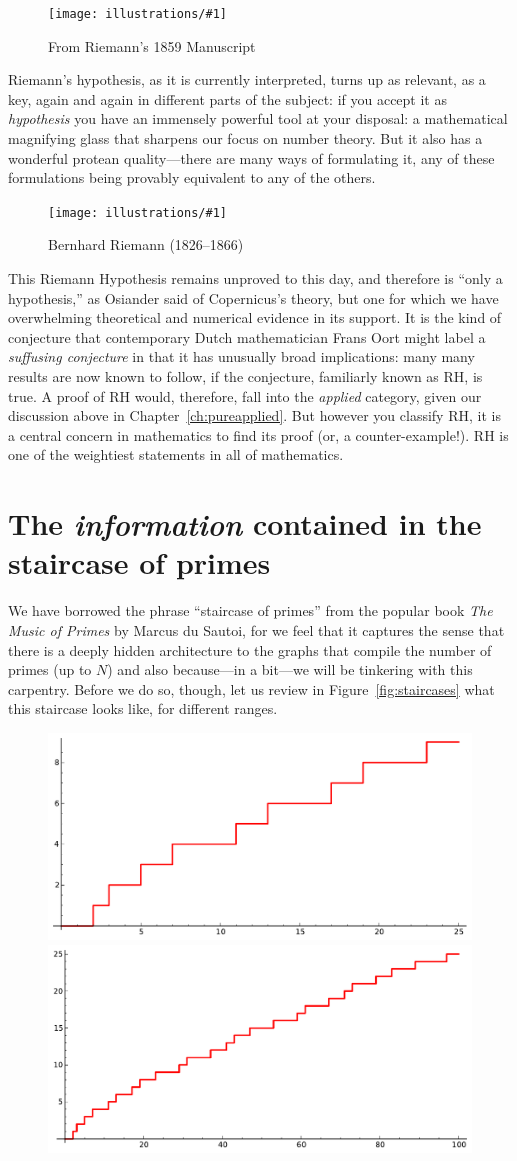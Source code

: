 \documentclass[openany]{book}
\newcommand{\ill}[3]{%
   \begin{figure}[H]%
   \vspace{-2ex}
   \centering%
   \texttt{[image: illustrations/\#1]}%
   \caption{#3}%
   \vspace{-2ex}
    \end{figure}}
\theoremstyle{plain}
\theoremstyle{definition}
\newcommand{\RH}{Riemann Hypothesis\index{Riemann Hypothesis}}
\begin{document}
{{\ill{riemann_zoom}{1}{From Riemann's 1859 Manuscript\label{fig:riemamn}}




Riemann's hypothesis, as it is currently interpreted, turns up as
relevant, as a key, again and again in different parts of the subject:
if you accept it as {\em hypothesis} you have an immensely powerful
tool at your disposal: a mathematical magnifying glass that sharpens
our focus on number theory. But it also has a wonderful protean
quality---there are many ways of formulating it, any of these
formulations being provably equivalent to any of the others.

\ill{riemann}{.3}{Bernhard Riemann (1826--1866)}


This \RH{} remains unproved to this day, and therefore is ``only a
hypothesis,'' as Osiander said of Copernicus's theory, but one for
which we have overwhelming theoretical and numerical evidence in its
support.  It is the kind of conjecture that contemporary Dutch
mathematician Frans Oort might label a {\em suffusing conjecture} in
that it has unusually broad implications: many many results are now
known to follow, if the conjecture, familiarly known as RH, is true.
A proof of RH would, therefore, fall into the {\em applied} category,
given our discussion above in Chapter~\ref{ch:pureapplied}.  But
however you classify RH, it is a central concern in mathematics to
find its proof (or, a counter-example!).  RH is one of the weightiest
statements in all of mathematics.


\chapter[The staircase of primes]{The {\em information} contained in the staircase of primes\label{sec:information}}



We have borrowed the phrase ``staircase of primes'' from the popular
book {\em The Music of Primes} by Marcus du Sautoi, for we feel that
it captures the sense that there is a deeply hidden architecture to
the graphs that compile the number of primes (up to $N$) and also
because---in a bit---we will be tinkering with this carpentry.  Before
we do so, though, let us review in Figure~\ref{fig:staircases}
what this staircase looks like, for
different ranges.

\begin{figure}[H]
\centering
\includegraphics[width=.4\textwidth]{illustrations/PN_25}
\includegraphics[width=.4\textwidth]{illustrations/PN_100}\\


\end{figure}}}
\end{document}
